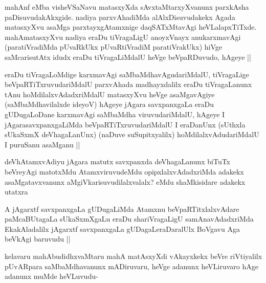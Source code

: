 

\begin{artha}
mahAnf eMba visheVSaNavu matasxyXda sAvxtaMtarxyXvanunx parxkAsha paDisuvudakAkxgide. nadiya parxvAhadiMda alAlxDisuvudakekx Agada matasxyXvu asaMga parxtayxgAtamxnige daqSATxMtavAgi heVLalapxTiTxde. mahAmatasxyXvu nadiya eraDu tiVragaLigU anoyxVnayx anukarxmavAgi (paratiVradiMda pUvaRkUkx pUvaRtiVradiM paratiVrakUkx) hiVge saMcarisutAtx idudx eraDu tiVragaLiMdalU heVge beVpaRDuvudo, hAgeye ||
\end{artha}


\begin{artha}
eraDu tiVragaLoMdige karxmavAgi saMbaMdhavAgudariMdalU, tiVragaLige beVpaRTiTxruvudariMdalU parxvAhada madhayxdalilx eraDu tiVragaLanunx tAnu hoMdilalxvAdadxriMdalU matasxyXvu heVge asaMgavAgiye (saMbaMdhavilalxde ideyoV) hAgeye jAgara savxpanxgaLa eraDu gUDugaLoDane karxmavAgi saMbaMdha viruvudariMdalU, hAgeye I jAgarasavxpanxgaLiMda beVpaRTiTxruvudariMdalU I eraDanUnx (sUthxla sUkaSxmX deVhagaLanUnx) (naDuve suSupitxyalilx) hoMdilalxvAdudariMdalU I puruSanu asaMganu ||
\end{artha}

\begin{artha}
deVhAtamxvAdiyu jAgara matutx savxpanxda deVhagaLanunx biTuTx beVreyAgi matotxMdu AtamxviruvudeMdu opipxlalxvAdadxriMda adakekx asaMgatavxvanunx aMgiVkarisuvudilalxvalalx? eMdu shaMkisidare adakekx utatxra
\end{artha}

\begin{artha}
A jAgarxtf savxpanxgaLa gUDugaLiMda Atamxnu beVpaRTitxlalxvAdare paMcaBUtagaLa sUkaSxmXgaLu eraDu shariVragaLigU samAnavAdadxriMda EkakAladalilx jAgarxtf savxpanxgaLa gUDagaLeraDaralUlx BoVgavu Aga beVkAgi baruvudu ||
\end{artha}


\begin{artha}
kelavaru mahAbudidhxvaMtaru mahA matAsxyXdi vAkayxkekx beVre riVtiyalilx pUvARpara saMbaMdhavanunx mADiruvaru, heVge adanunx heVLiruvaro hAge adanunx muMde heVLuvudu-
\end{artha}

